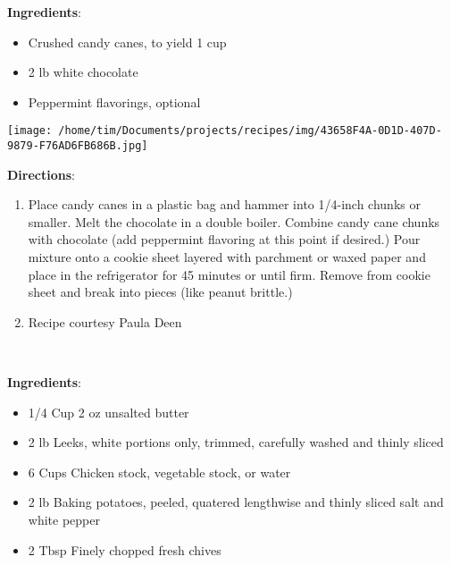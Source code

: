 \documentclass[11pt, twoside, openany]{book}
\begin{document}
\begin{minipage}[t]{0.8\linewidth}
\textbf{Ingredients}:\vspace{-3mm}
\begin{multicols}{2}
\begin{itemize}\setlength\itemsep{-1mm}
\item Crushed candy canes, to yield 1 cup
\item 2 lb white chocolate
\item Peppermint flavorings, optional
\end{itemize}
\end{multicols}
\end{minipage}
\begin{minipage}[t]{0.2\linewidth}
\centering \strut\vspace*{-\baselineskip}\newline
\texttt{[image: /home/tim/Documents/projects/recipes/img/43658F4A-0D1D-407D-9879-F76AD6FB686B.jpg]}\\
\end{minipage}\vspace{3mm}
\textbf{Directions}:
\vspace{-3mm}\begin{enumerate}\setlength\itemsep{-1mm}
\item Place candy canes in a plastic bag and hammer into 1/4-inch chunks or smaller. Melt the chocolate in a double boiler. Combine candy cane chunks with chocolate (add peppermint flavoring at this point if desired.) Pour mixture onto a cookie sheet layered with parchment or waxed paper and place in the refrigerator for 45 minutes or until firm. Remove from cookie sheet and break into pieces (like peanut brittle.)
\item Recipe courtesy Paula Deen
\end{enumerate}
 \label{potato-&-leek-soup}\hfill\textit{}\\
\begin{minipage}[t]{0.8\linewidth}
\textbf{Ingredients}:\vspace{-3mm}
\begin{multicols}{2}
\begin{itemize}\setlength\itemsep{-1mm}
\item 1/4 Cup 2 oz unsalted butter
\item 2 lb Leeks, white portions only, trimmed, carefully washed and thinly sliced
\item 6 Cups Chicken stock, vegetable stock, or water
\item 2 lb Baking potatoes, peeled, quatered lengthwise and thinly sliced salt and white pepper
\item 2 Tbsp Finely chopped fresh chives
\end{itemize}
\end{multicols}
\end{minipage}
\end{document}
